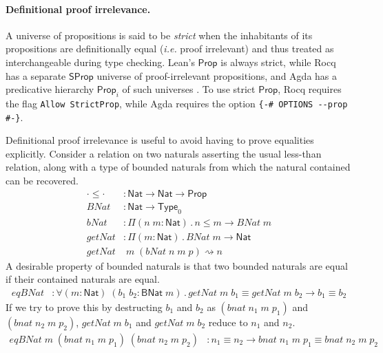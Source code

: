 \documentclass{article}
\makeatletter
\newcommand{\ie}{\textit{i.e.}\@\xspace}
\newcommand{\kw}[1]{\mathsf{#1}}
\newcommand{\code}[1]{\texttt{#1}}
\makeatother
\begin{document}
\paragraph{Definitional proof irrelevance.}
A universe of propositions is said to be \emph{strict}
when the inhabitants of its propositions are definitionally equal
(\ie proof irrelevant)
and thus treated as interchangeable during type checking.
Lean's $\kw{Prop}$ is always strict, while
Rocq has a separate $\kw{SProp}$ universe of proof-irrelevant propositions,
and Agda has a predicative hierarchy $\kw{Prop}_i$ of such universes \citep{sprop}.
To use strict $\kw{Prop}$,
Rocq requires the flag \code{Allow StrictProp},
while Agda requires the option \code{\{-\# OPTIONS -{}-prop \#-\}}.

Definitional proof irrelevance is useful to avoid having to prove equalities explicitly.
Consider a relation on two naturals asserting the usual less-than relation,
along with a type of bounded naturals from which the natural contained can be recovered.
%
\begin{align*}
  \cdot \le \cdot &: \kw{Nat} \to \kw{Nat} \to \kw{Prop} \\
  \mathit{BNat} &: \kw{Nat} \to \kw{Type}_0 \\
  \mathit{bNat} &: \Pi (n \; m : \kw{Nat})\mathpunct{.} n \le m \to \mathit{BNat} \; m \\
  \mathit{getNat} &: \Pi (m : \kw{Nat})\mathpunct{.} \mathit{BNat} \; m \to \kw{Nat} \\
  \mathit{getNat} &\; m \; (\mathit{bNat} \; n \; m \; p) \rightsquigarrow n
\end{align*}
%
A desirable property of bounded naturals is that
two bounded naturals are equal if their contained naturals are equal.
%
\begin{align*}
  \mathit{eqBNat} &: \forall (m : \kw{Nat}) \; (b_1 \; b_2 : \kw{BNat} \; m) \mathpunct{.}
    \mathit{getNat} \; m \; b_1 \equiv \mathit{getNat} \; m \; b_2 \to b_1 \equiv b_2
\end{align*}
%
If we try to prove this by destructing $b_1$ and $b_2$ as
$(\mathit{bnat} \; n_1 \; m \; p_1)$ and $(\mathit{bnat} \; n_2 \; m \; p_2)$,
$\mathit{getNat} \; m \; b_1$ and $\mathit{getNat} \; m \; b_2$ reduce to $n_1$ and $n_2$.
%
\begin{align*}
  \mathit{eqBNat} \; m \; (\mathit{bnat} \; n_1 \; m \; p_1) \; (\mathit{bnat} \; n_2 \; m \; p_2)
    &: n_1 \equiv n_2 \to \mathit{bnat} \; n_1 \; m \; p_1 \equiv \mathit{bnat} \; n_2 \; m \; p_2
\end{align*}
\end{document}
